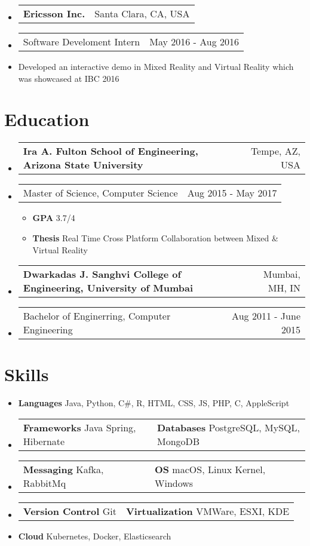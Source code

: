 \documentclass[a4paper,12pt]{article} %
\makeatletter
\newcommand\tableVerticalSpace{-1em}
\newcommand\tableItemVerticalSpace{-1em}
\newcommand\zeroSpacing{0em}
\newcommand\sectionSpacing{0.5em}
\newcommand{\fourElementListStart}{\begin{itemize}[label={},leftmargin=*]\setlength\itemsep{0.3em}}
\newcommand{\fourElementListEnd}{\end{itemize}\vspace{\zeroSpacing}}
\newcommand{\generalListStart}{\vspace{\zeroSpacing}\begin{itemize}[leftmargin=2em]\setlength\itemsep{-0.4em}}
\newcommand{\generalListEnd}{\end{itemize}\vspace{\zeroSpacing}}
\newcommand{\generalSubListStart}{\vspace{-1em}\begin{itemize}[leftmargin=2em]\setlength\itemsep{-0.2em}}
\newcommand{\generalSubListEnd}{\end{itemize}\vspace{\zeroSpacing}}
\newcommand{\institutionItem}[2]{
	\vspace{\tableItemVerticalSpace}\item
		\begin{tabular*}{\textwidth}{@{}l@{\extracolsep{\fill}}r@{}}
			\textbf{#1} & {\small{#2}} \\[\zeroSpacing]
		\end{tabular*}\vspace{\tableVerticalSpace}
}
\newcommand{\twoElementItem}[2]{
	\vspace{\tableItemVerticalSpace}\item
		\begin{tabular*}{\textwidth}{@{}l@{\extracolsep{\fill}}r@{}}
			{#1} & {\small{#2}} \\[\zeroSpacing]
		\end{tabular*}\vspace{\tableVerticalSpace}
}
\newcommand{\twoKeyValuePairElementItem}[4]{
	\vspace{\tableItemVerticalSpace}\item
		\begin{tabular}{@{}p{7cm}p{11cm}}

			\vspace{0.5em}\textbf{#1}{ #2} & \vspace{0.5em}\textbf{#3}{ #4}

		\end{tabular}\vspace{\tableVerticalSpace}
}
\newcommand{\oneKeyValuePairElement}[2]{
	\item \textbf{#1}{ #2}
}
\makeatother
\begin{document}
\fourElementListStart
	\institutionItem {Ericsson Inc.}{Santa Clara, CA, USA}
	\twoElementItem{Software Develoment Intern}{May 2016 - Aug 2016}
\fourElementListEnd

\generalListStart
	\item Developed an interactive demo in Mixed Reality and Virtual Reality which was showcased at IBC 2016\vspace{-1em}
\generalListEnd

\vspace{\sectionSpacing}\section*{Education}

\fourElementListStart
	\institutionItem {Ira A. Fulton School of Engineering, Arizona State University}{Tempe, AZ, USA}
	\twoElementItem {Master of Science, Computer Science}{Aug 2015 - May 2017}
	\generalSubListStart
		\item \textbf{GPA} 3.7/4
		\item \textbf{Thesis} Real Time Cross Platform Collaboration between Mixed \& Virtual Reality
	\generalSubListEnd
	\institutionItem {Dwarkadas J. Sanghvi College of Engineering, University of Mumbai}{Mumbai, MH, IN}
	\twoElementItem {Bachelor of Enginerring, Computer Engineering}{Aug 2011 - June 2015}
\fourElementListEnd


\vspace{0.8em}\section*{Skills}

\generalListStart
	\vspace{-0.5em}\oneKeyValuePairElement{Languages}{Java, Python, C\#, R, HTML, CSS, JS, PHP, C, AppleScript}
	\twoKeyValuePairElementItem{Frameworks}{Java Spring, Hibernate}{Databases}{PostgreSQL, MySQL, MongoDB}
	\vspace{-0.5em}\twoKeyValuePairElementItem{Messaging}{Kafka, RabbitMq}{OS}{macOS, Linux Kernel, Windows}
	\vspace{-0.5em}\twoKeyValuePairElementItem{Version Control}{Git}{Virtualization}{VMWare, ESXI, KDE}
	\vspace{-0.5em}\oneKeyValuePairElement{Cloud}{Kubernetes, Docker, Elasticsearch}
\generalListEnd
\end{document}
